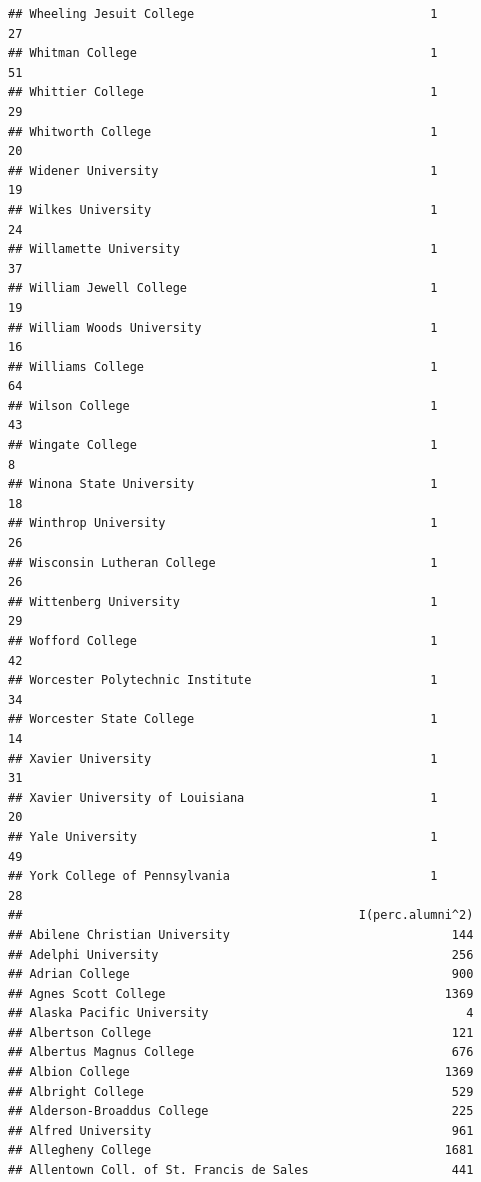 \documentclass[
]{article}
\begin{document}
\begin{verbatim}
## Wheeling Jesuit College                                 1          27
## Whitman College                                         1          51
## Whittier College                                        1          29
## Whitworth College                                       1          20
## Widener University                                      1          19
## Wilkes University                                       1          24
## Willamette University                                   1          37
## William Jewell College                                  1          19
## William Woods University                                1          16
## Williams College                                        1          64
## Wilson College                                          1          43
## Wingate College                                         1           8
## Winona State University                                 1          18
## Winthrop University                                     1          26
## Wisconsin Lutheran College                              1          26
## Wittenberg University                                   1          29
## Wofford College                                         1          42
## Worcester Polytechnic Institute                         1          34
## Worcester State College                                 1          14
## Xavier University                                       1          31
## Xavier University of Louisiana                          1          20
## Yale University                                         1          49
## York College of Pennsylvania                            1          28
##                                               I(perc.alumni^2)
## Abilene Christian University                               144
## Adelphi University                                         256
## Adrian College                                             900
## Agnes Scott College                                       1369
## Alaska Pacific University                                    4
## Albertson College                                          121
## Albertus Magnus College                                    676
## Albion College                                            1369
## Albright College                                           529
## Alderson-Broaddus College                                  225
## Alfred University                                          961
## Allegheny College                                         1681
## Allentown Coll. of St. Francis de Sales                    441

\end{verbatim}
\end{document}
